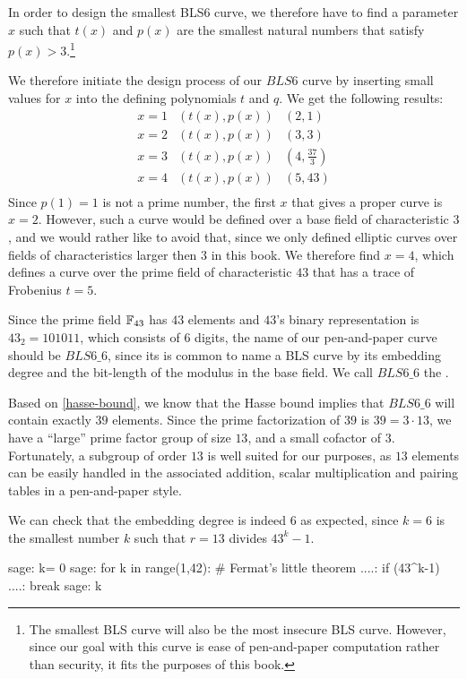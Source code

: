 In order to design the smallest BLS6 curve, we therefore have to find a parameter $x$ such that $t(x)$ and $p(x)$ are the smallest natural numbers that satisfy $p(x)>3$.\footnote{The smallest BLS curve will also be the most insecure BLS curve. However, since our goal with this curve is ease of pen-and-paper computation rather than security, it fits the purposes of this book.}

We therefore initiate the design process of our $BLS6$ curve by inserting small values for $x$ into the defining polynomials $t$ and $q$. We get the following results:
$$
\begin{array}{lcr}
x=1 & (t(x),p(x)) & (2,1)\\
x=2 & (t(x),p(x)) & (3,3)\\
x=3 & (t(x),p(x)) & (4,\frac{37}{3})\\
x=4 & (t(x),p(x)) & (5,43)\\
\end{array}
$$
Since $p(1)=1$ is not a prime number, the first $x$ that gives a proper curve is $x=2$. However, such a curve would be defined over a base field of characteristic $3$, and we would rather like to avoid that, since we only defined elliptic curves over fields of characteristics larger then $3$ in this book. We therefore find $x=4$, which defines a curve over the prime field of characteristic $43$ that has a trace of Frobenius $t=5$. 

Since the prime field $\mathbb{F}_{43}$ has $43$ elements and $43$'s binary representation is $43_2= 101011$, which consists of $6$ digits, the name of our pen-and-paper curve should be $BLS6\_6$, since its is common to name a BLS curve by its embedding degree and the bit-length of the modulus in the base field. We call $BLS6\_6$ the .

Based on \ref{hasse-bound}, we know that the Hasse bound implies that $BLS6\_6$ will contain exactly $39$ elements. Since the prime factorization of $39$ is $39=3\cdot 13$, we have a ``large'' prime factor group of size $13$, and a small cofactor of $3$. Fortunately, a subgroup of order $13$ is well suited for our purposes, as $13$ elements can be easily handled in the associated addition, scalar multiplication and pairing tables in a pen-and-paper style. 

We can check that the embedding degree is indeed $6$ as expected, since $k = 6$ is the smallest number $k$ such that $r=13$ divides $43^k-1$. 
\begin{sagecommandline}
sage: k= 0
sage: for k in range(1,42): # Fermat's little theorem
....:     if (43^k-1)%
....:         break
sage: k
\end{sagecommandline}

